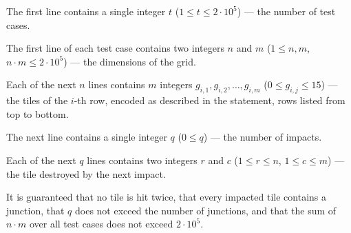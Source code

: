 The first line contains a single integer $t$ ($1 \le t \le 2 \cdot 10^5$) --- the number of test cases.

The first line of each test case contains two integers $n$ and $m$ ($1 \le n, m$, $n \cdot m \le 2 \cdot 10^5$) --- the dimensions of the grid.

Each of the next $n$ lines contains $m$ integers $g_{i,1}, g_{i,2}, \ldots, g_{i,m}$ ($0 \le g_{i,j} \le 15$) --- the tiles of the $i$-th row, encoded as described in the statement, rows listed from top to bottom.

The next line contains a single integer $q$ ($0 \le q$) --- the number of impacts.

Each of the next $q$ lines contains two integers $r$ and $c$ ($1 \le r \le n$, $1 \le c \le m$) --- the tile destroyed by the next impact.

It is guaranteed that no tile is hit twice, that every impacted tile contains a junction, that $q$ does not exceed the number of junctions, and that the sum of $n \cdot m$ over all test cases does not exceed $2 \cdot 10^5$.
